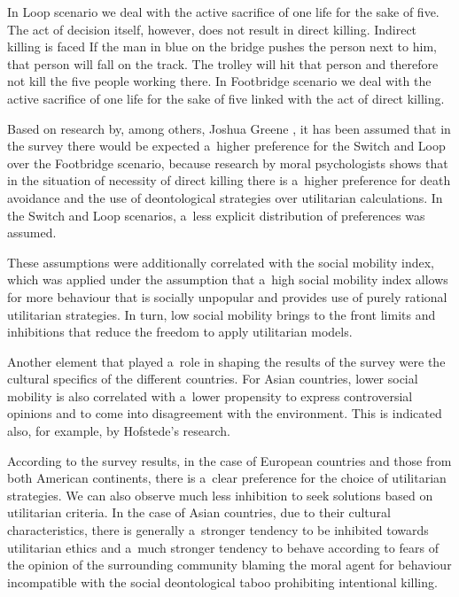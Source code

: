In Loop scenario we deal with the active sacrifice of one life for the sake of five. The act of decision itself, however, does not result in direct killing. Indirect killing is faced If the man in blue on the bridge pushes the person next to him, that person will fall on the track. The trolley will hit that person and therefore not kill the five people working there. In Footbridge scenario we deal with the active sacrifice of one life for the sake of five linked with the act of direct killing.

Based on research by, among others, Joshua Greene
\parencite*[][]{greene_moral_2013}, %
 it has been assumed that in the survey there would be expected a~higher preference for the Switch and Loop over the Footbridge scenario, because research by moral psychologists shows that in the situation of necessity of direct killing there is a~higher preference for death avoidance and the use of deontological strategies over utilitarian calculations. In the Switch and Loop scenarios, a~less explicit distribution of preferences was assumed.

These assumptions were additionally correlated with the social mobility index, which was applied under the assumption that a~high social mobility index allows for more behaviour that is socially unpopular and provides use of purely rational utilitarian strategies. In turn, low social mobility brings to the front limits and inhibitions that reduce the freedom to apply utilitarian models.

Another element that played a~role in shaping the results of the survey were the cultural specifics of the different countries. For Asian countries, lower social mobility is also correlated with a~lower propensity to express controversial opinions and to come into disagreement with the environment. This is indicated also, for example, by Hofstede's research.

According to the survey results, in the case of European countries and those from both American continents, there is a~clear preference for the choice of utilitarian strategies. We can also observe much less inhibition to seek solutions based on utilitarian criteria. In the case of Asian countries, due to their cultural characteristics, there is generally a~stronger tendency to be inhibited towards utilitarian ethics and a~much stronger tendency to behave according to fears of the opinion of the surrounding community blaming the moral agent for behaviour incompatible with the social deontological taboo prohibiting intentional killing.

